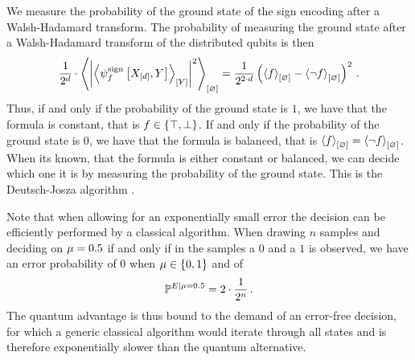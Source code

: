 \begin{example}
    We measure the probability of the ground state of the sign encoding after a Walsh-Hadamard transform.
    The probability of measuring the ground state after a Walsh-Hadamard transform of the distributed qubits is then
    \begin{align*}
        \frac{1}{2^{d}} \cdot \left\langle \left|\left\langle \psi^{\mathrm{sign}}_{f}\left[X_{[d]},Y\right]\right\rangle_{\left[ Y \right]}\right|^2\right\rangle_{\left[ \varnothing \right]}
        = \frac{1}{2^{2\cdot d}} \left(\left\langle f\right\rangle_{\left[ \varnothing \right]}-\left\langle \lnot f\right\rangle_{\left[ \varnothing \right]}\right)^2 \, .
    \end{align*}
    Thus, if and only if the probability of the ground state is $1$, we have that the formula is constant, that is $f\in\{\top,\bot\}$.
    If and only if the probability of the ground state is $0$, we have that the formula is balanced, that is $\left\langle f\right\rangle_{\left[ \varnothing \right]}=\left\langle \lnot f\right\rangle_{\left[ \varnothing \right]}$.
    When its known, that the formula is either constant or balanced, we can decide which one it is by measuring the probability of the ground state.
    This is the Deutsch-Josza algorithm \cite{deutsch_rapid_1992}.

    Note that when allowing for an exponentially small error the decision can be efficiently performed by a classical algorithm.
    When drawing $n$ samples and deciding on $\mu=0.5$ if and only if in the samples a $0$ and a $1$ is observed, we have an error probability of $0$ when $\mu\in\{0,1\}$ and of
    \begin{align*}
        \mathbb{P}^{E|\mu=0.5} = 2 \cdot \frac{1}{2^{n}} \, .
    \end{align*}
    The quantum advantage is thus bound to the demand of an error-free decision, for which a generic classical algorithm would iterate through all states and is therefore exponentially slower than the quantum alternative.

    \begin{figure}
\end{figure}
\end{example}

